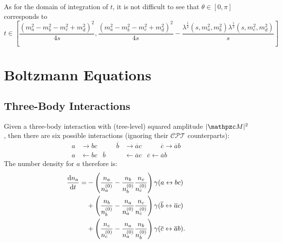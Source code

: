 \documentclass{scrartcl}
\begin{document}
As for the domain of integration of \(t\), it is not difficult to see that
\(\theta \in [0, \pi]\) corresponds to
\begin{equation}
  t \in \left[
    \frac{\left( m_a^2 - m_b^2 - m_c^2 + m_d^2 \right)^2}{4 s},
    \frac{\left( m_a^2 - m_b^2 - m_c^2 + m_d^2 \right)^2}{4 s}
    - \frac{\lambda^{\frac{1}{2}}(s, m_a^2, m_b^2) \lambda^{\frac{1}{2}}(s, m_c^2, m_d^2)}{s}
    \right]
\end{equation}

\section{Boltzmann Equations}%
\label{sec:boltzmann_equation}

\subsection{Three-Body Interactions}%
\label{sec:three-body_interactions}

Given a three-body interaction with (tree-level) squared amplitude
\(\abs{\pzcM}^2\), then there are six possible interactions (ignoring their
\(\mathcal{CPT}\) counterparts):
\begin{equation}
  \begin{aligned}
    a           & \to bc                         & \qquad
    \overline b & \to \overline ac               & \qquad
    \overline c \to \overline ab                          \\
    a           & \gets bc                       &
    \overline b & \gets \overline ac
                & \overline c \gets \overline ab
  \end{aligned}
\end{equation}
The number density for \(a\) therefore is:
\begin{equation}
  \begin{aligned}
    \frac{\mathop{}\!\mathrm{d}{n_a}}{\mathop{}\!\mathrm{d}{t}} =
     & - \left( \frac{n_a}{n_a^{(0)}} - \frac{n_b}{n_b^{(0)}} \frac{n_c}{n_c^{(0)}} \right) \gamma(a \leftrightarrow bc)                       \\
     & + \left( \frac{n_b}{n_b^{(0)}} - \frac{n_a}{n_a^{(0)}} \frac{n_c}{n_c^{(0)}} \right) \gamma(\overline b \leftrightarrow \overline a c)  \\
     & + \left( \frac{n_c}{n_c^{(0)}} - \frac{n_a}{n_a^{(0)}} \frac{n_b}{n_b^{(0)}} \right) \gamma(\overline c \leftrightarrow \overline a b).
  \end{aligned}
\end{equation}
\end{document}
